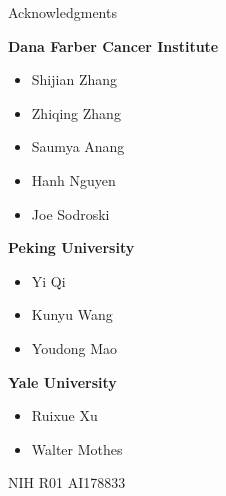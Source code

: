 \begin{frame}[fragile]{Acknowledgments}
    \begin{center}
        \begin{minipage}[t][.6\textheight]{0.45\textwidth}
            \textcolor{DUred}{\bf Dana Farber Cancer Institute}
            \begin{itemize}
                \item[] Shijian Zhang
                \item[] Zhiqing Zhang
                \item[] Saumya Anang
                \item[] Hanh Nguyen
                \item[] Joe Sodroski
            \end{itemize}
            \textcolor{DUred}{\bf Peking University}
            \begin{itemize}
                \item[] Yi Qi
                \item[] Kunyu Wang
                \item[] Youdong Mao
            \end{itemize}
        \end{minipage}\hfill
        \begin{minipage}[t][.6\textheight]{0.45\textwidth}
            \textcolor{DUred}{\bf Yale University}
            \begin{itemize}
                \item[] Ruixue Xu
                \item[] Walter Mothes
            \end{itemize}
        \end{minipage}

        \color{DUgreen!90!black}{\bf Funding:} NIH R01 AI178833
    \end{center}
\end{frame}

